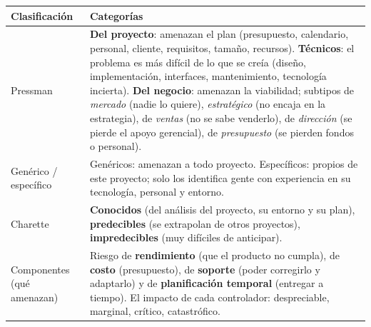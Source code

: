 \documentclass[11pt,a4paper]{article}
\begin{document}
\begin{center}\small
\begin{tabularx}{\textwidth}{@{}l X@{}}
\toprule
\textbf{Clasificación} & \textbf{Categorías}\\
\midrule
Pressman & \textbf{Del proyecto}: amenazan el plan (presupuesto, calendario, personal, cliente, requisitos,
tamaño, recursos). \textbf{Técnicos}: el problema es más difícil de lo que se creía (diseño, implementación,
interfaces, mantenimiento, tecnología incierta). \textbf{Del negocio}: amenazan la viabilidad; subtipos de
\emph{mercado} (nadie lo quiere), \emph{estratégico} (no encaja en la estrategia), de \emph{ventas} (no se
sabe venderlo), de \emph{dirección} (se pierde el apoyo gerencial), de \emph{presupuesto} (se pierden fondos o
personal).\\
Genérico / específico & Genéricos: amenazan a todo proyecto. Específicos: propios de este proyecto; solo los
identifica gente con experiencia en su tecnología, personal y entorno.\\
Charette & \textbf{Conocidos} (del análisis del proyecto, su entorno y su plan), \textbf{predecibles} (se
extrapolan de otros proyectos), \textbf{impredecibles} (muy difíciles de anticipar).\\
Componentes (qué amenazan) & Riesgo de \textbf{rendimiento} (que el producto no cumpla), de \textbf{costo}
(presupuesto), de \textbf{soporte} (poder corregirlo y adaptarlo) y de \textbf{planificación temporal}
(entregar a tiempo). El impacto de cada controlador: despreciable, marginal, crítico, catastrófico.\\
\bottomrule
\end{tabularx}
\end{center}
\end{document}
